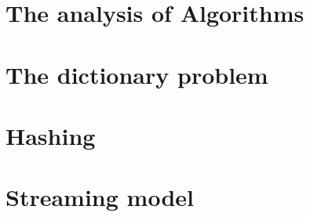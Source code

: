 \documentclass[dawn, draft]{lectures2}
\begin{document}
    \maketitle

    \section{The analysis of Algorithms}
    

    \section{The dictionary problem}
    

    \section{Hashing}
    

    \section{Streaming model}
    

    \printbibliography
\end{document}
